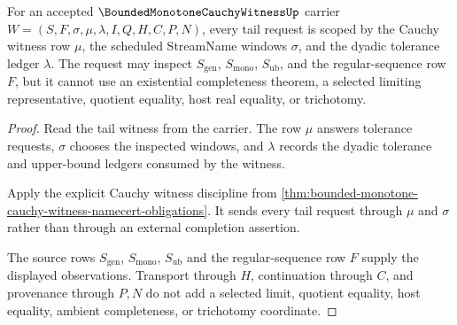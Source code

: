 \begin{theorem}
\label{thm:bounded-monotone-cauchy-witness-tail-modulus-scope}
For an accepted $\BoundedMonotoneCauchyWitnessUp$ carrier $W=(S,F,\sigma,\mu,\lambda,I,Q,H,C,P,N)$, every tail request is scoped by the Cauchy witness row $\mu$, the scheduled StreamName windows $\sigma$, and the dyadic tolerance ledger $\lambda$. The request may inspect $S_{\mathrm{gen}}$, $S_{\mathrm{mono}}$, $S_{\mathrm{ub}}$, and the regular-sequence row $F$, but it cannot use an existential completeness theorem, a selected limiting representative, quotient equality, host real equality, or trichotomy.
\end{theorem}
\begin{proof}
Read the tail witness from the carrier. The row $\mu$ answers tolerance requests, $\sigma$ chooses the inspected windows, and $\lambda$ records the dyadic tolerance and upper-bound ledgers consumed by the witness.

Apply the explicit Cauchy witness discipline from \autoref{thm:bounded-monotone-cauchy-witness-namecert-obligations}. It sends every tail request through $\mu$ and $\sigma$ rather than through an external completion assertion.

The source rows $S_{\mathrm{gen}}$, $S_{\mathrm{mono}}$, $S_{\mathrm{ub}}$ and the regular-sequence row $F$ supply the displayed observations. Transport through $H$, continuation through $C$, and provenance through $P,N$ do not add a selected limit, quotient equality, host equality, ambient completeness, or trichotomy coordinate.
\end{proof}

